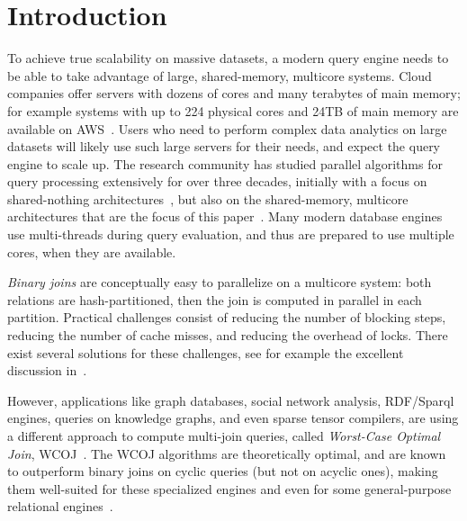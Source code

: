 \section{Introduction} \label{sec:intro}

To achieve true scalability on massive datasets, a modern query engine
needs to be able to take advantage of large, shared-memory, multicore
systems.  Cloud companies offer servers with dozens of cores and many
terabytes of main memory; for example systems with up to 224 physical
cores and 24TB of main memory are available on
AWS~\cite{aws-ec2-high-memory}.  Users who need to perform complex
data analytics on large datasets will likely use such large servers
for their needs, and expect the query engine to scale up.  The
research community has studied parallel algorithms for query
processing extensively for over three decades, initially with a focus
on shared-nothing
architectures~\cite{DBLP:journals/tkde/DeWittGSBHR90,DBLP:journals/sigmod/DeWittG90,DBLP:journals/cacm/DeWittG92,DBLP:conf/vldb/DeWittNSS92},
but also on the shared-memory, multicore architectures that are the
focus of this
paper~\cite{DBLP:journals/vldb/BonczK99,DBLP:conf/sigmod/BlanasLP11,DBLP:conf/sigmod/ZhangHZH19,DBLP:conf/sigmod/ShahvaraniJ20,DBLP:conf/sigmod/0001MHGZHMM21,DBLP:conf/sigmod/0001MHGZHMM21,DBLP:conf/sigmod/WuWZ22}.
Many modern database engines use multi-threads during query
evaluation, and thus are prepared to use multiple cores, when they are
available.

{\em Binary joins} are conceptually easy to parallelize on a multicore
system: both relations are hash-partitioned, then the join is computed
in parallel in each partition.  Practical challenges consist of
reducing the number of blocking steps, reducing the number of cache
misses, and reducing the overhead of locks.  There exist several
solutions for these challenges, see for example the excellent
discussion in~\cite{DBLP:conf/sigmod/BlanasLP11}.

However, applications like graph databases, social network analysis, 
RDF/Sparql engines, queries on knowledge graphs, and even sparse tensor
compilers, are using a different approach to compute multi-join
queries, called \emph{Worst-Case Optimal Join},
WCOJ~\cite{DBLP:conf/icdt/Veldhuizen14,DBLP:conf/spire/BrisaboaCFN15,DBLP:conf/sigmod/ChuBS15,DBLP:conf/sigmod/AbergerTOR16,DBLP:journals/pvldb/FreitagBSKN20,DBLP:conf/sigmod/ArroyueloHNRRS21,DBLP:journals/pacmmod/WangWS23,DBLP:journals/sigmod/Salihoglu23,DBLP:conf/cidr/JinFCLS23}.
The WCOJ algorithms are theoretically optimal, and are known to
outperform binary joins on cyclic queries (but not on acyclic ones),
making them well-suited for these specialized engines and even for
some general-purpose relational
engines~\cite{DBLP:conf/sigmod/ArefCGKOPVW15,DBLP:journals/pvldb/FreitagBSKN20}.

